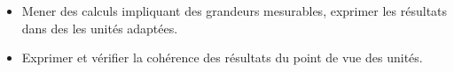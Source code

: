 \begin{prerequis}    
    \begin{itemize}        
        \item[\emoji{diamond-suit}] Mener des calculs impliquant des grandeurs mesurables, exprimer les résultats dans des les unités adaptées.
        \item[\emoji{diamond-suit}] Exprimer et vérifier la cohérence des résultats du point de vue des unités.
    \end{itemize}
\end{prerequis}